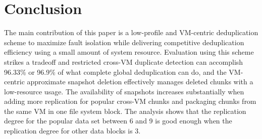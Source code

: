 \section{Conclusion}
\label{sect:conclusion}
The main contribution of this paper is a low-profile and VM-centric deduplication scheme to 
maximize fault isolation while delivering competitive deduplication efficiency using
a small amount of system resource.
Evaluation using  this scheme strikes a tradeoff and restricted cross-VM duplicate detection
can accomplish 96.33\% or 96.9\% of what complete global
deduplication can do, and the VM-centric
approximate snapshot deletion effectively manages deleted chunks with a 
low-resource usage.  The availability of snapshots increases substantially when
adding more replication for popular cross-VM chunks and packaging chunks from the same 
VM in one file system block. The analysis shows that the replication degree
for the popular data set between 6 and 9 is good enough when the replication degree
for other data blocks is 3.


